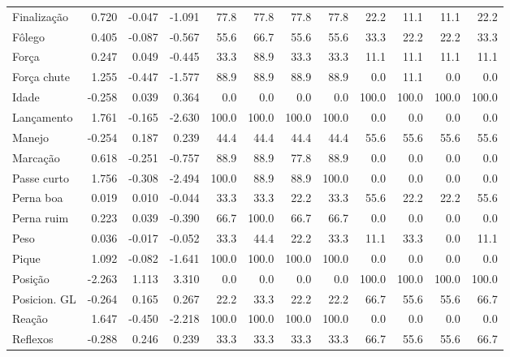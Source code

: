 \documentclass[review]{elsarticle}
\begin{document}
\begin{table}[ht]
\begin{small}
\begin{tabular}{l||rrr||rrr|r|||rrr||r}
\rowcolor{gray!10!}   Finalização & 0.720 & -0.047 & -1.091 & 77.8 & 77.8 & 77.8 & 77.8 & 22.2 & 11.1 & 11.1 & 22.2 \\ 
\rowcolor{gray!30!}   Fôlego & 0.405 & -0.087 & -0.567 & 55.6 & 66.7 & 55.6 & 55.6 & 33.3 & 22.2 & 22.2 & 33.3 \\ 
\rowcolor{gray!10!}   Força & 0.247 & 0.049 & -0.445 & 33.3 & 88.9 & 33.3 & 33.3 & 11.1 & 11.1 & 11.1 & 11.1 \\ 
\rowcolor{gray!30!}   Força chute & 1.255 & -0.447 & -1.577 & 88.9 & 88.9 & 88.9 & 88.9 & 0.0 & 11.1 & 0.0 & 0.0 \\ 
\rowcolor{gray!10!}   Idade & -0.258 & 0.039 & 0.364 & 0.0 & 0.0 & 0.0 & 0.0 & 100.0 & 100.0 & 100.0 & 100.0 \\ 
\rowcolor{gray!30!}   Lançamento & 1.761 & -0.165 & -2.630 & 100.0 & 100.0 & 100.0 & 100.0 & 0.0 & 0.0 & 0.0 & 0.0 \\ 
\rowcolor{gray!10!}   Manejo & -0.254 & 0.187 & 0.239 & 44.4 & 44.4 & 44.4 & 44.4 & 55.6 & 55.6 & 55.6 & 55.6 \\ 
\rowcolor{gray!30!}   Marcação & 0.618 & -0.251 & -0.757 & 88.9 & 88.9 & 77.8 & 88.9 & 0.0 & 0.0 & 0.0 & 0.0 \\ 
\rowcolor{gray!10!}   Passe curto & 1.756 & -0.308 & -2.494 & 100.0 & 88.9 & 88.9 & 100.0 & 0.0 & 0.0 & 0.0 & 0.0 \\ 
 \rowcolor{gray!30!}  Perna boa & 0.019 & 0.010 & -0.044 & 33.3 & 33.3 & 22.2 & 33.3 & 55.6 & 22.2 & 22.2 & 55.6 \\ 
\rowcolor{gray!10!}   Perna ruim & 0.223 & 0.039 & -0.390 & 66.7 & 100.0 & 66.7 & 66.7 & 0.0 & 0.0 & 0.0 & 0.0 \\ 
 \rowcolor{gray!30!}  Peso & 0.036 & -0.017 & -0.052 & 33.3 & 44.4 & 22.2 & 33.3 & 11.1 & 33.3 & 0.0 & 11.1 \\ 
\rowcolor{gray!10!}   Pique & 1.092 & -0.082 & -1.641 & 100.0 & 100.0 & 100.0 & 100.0 & 0.0 & 0.0 & 0.0 & 0.0 \\ 
\rowcolor{gray!30!}   Posição & -2.263 & 1.113 & 3.310 & 0.0 & 0.0 & 0.0 & 0.0 & 100.0 & 100.0 & 100.0 & 100.0 \\ 
 \rowcolor{gray!10!}  Posicion. GL & -0.264 & 0.165 & 0.267 & 22.2 & 33.3 & 22.2 & 22.2 & 66.7 & 55.6 & 55.6 & 66.7 \\ 
 \rowcolor{gray!30!}  Reação & 1.647 & -0.450 & -2.218 & 100.0 & 100.0 & 100.0 & 100.0 & 0.0 & 0.0 & 0.0 & 0.0 \\ 
\rowcolor{gray!10!}   Reflexos & -0.288 & 0.246 & 0.239 & 33.3 & 33.3 & 33.3 & 33.3 & 66.7 & 55.6 & 55.6 & 66.7 \\ 

\end{tabular}
\end{small}
\end{table}
\end{document}
